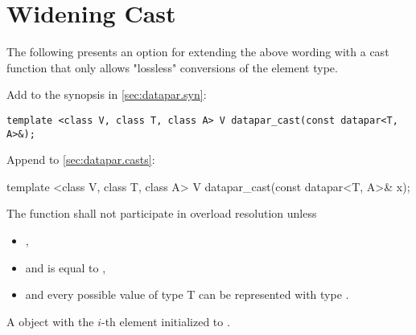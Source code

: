 \section{Widening Cast}\label{sec:widen}
The following presents an option for extending the above wording with a cast function that only allows "lossless" conversions of the element type.

Add to the synopsis in \ref{sec:datapar.syn}:
\begin{wgText}
  \begin{lstlisting}[style=Vc]
    template <class V, class T, class A> V datapar_cast(const datapar<T, A>&);
  \end{lstlisting}
\end{wgText}

Append to \ref{sec:datapar.casts}:
\begin{wgText}
  \begin{itemdecl}
    template <class V, class T, class A> V datapar_cast(const datapar<T, A>& x);
  \end{itemdecl}
  \begin{itemdescr}
    \pnum\remarks The function shall not participate in overload resolution unless
    \begin{itemize}
      \item {},
      \item and  is equal to ,
      \item and every possible value of type \type T can be represented with type \datapar\code{::}.
    \end{itemize}
    \pnum\returns A \datapar object with the $i$-th element initialized to .
  \end{itemdescr}
\end{wgText}
